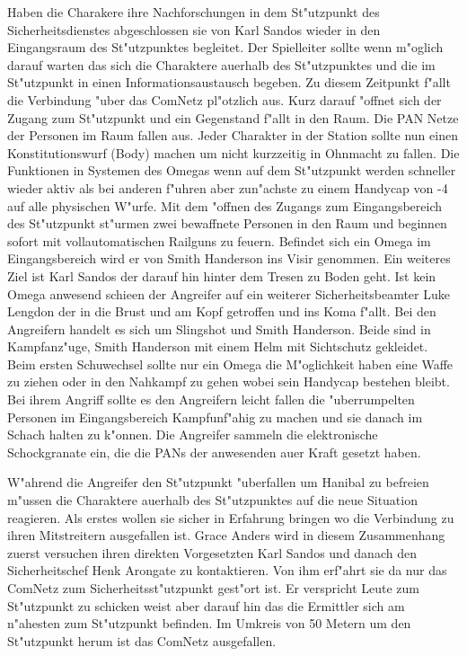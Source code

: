 
Haben die Charakere ihre Nachforschungen in dem St"utzpunkt des Sicherheitsdienstes abgeschlossen sie von Karl Sandos wieder in den Eingangsraum des St"utzpunktes begleitet. Der Spielleiter sollte wenn m"oglich darauf warten das sich die Charaktere au\3erhalb des St"utzpunktes und die im St"utzpunkt in einen Informationsaustausch begeben. Zu diesem Zeitpunkt f"allt die Verbindung "uber das ComNetz pl"otzlich aus. Kurz darauf "offnet sich der Zugang zum St"utzpunkt und ein Gegenstand f"allt in den Raum. Die PAN Netze der Personen im Raum fallen aus. Jeder Charakter in der Station sollte nun einen Konstitutionswurf (Body) machen um nicht kurzzeitig in Ohnmacht zu fallen. Die Funktionen in Systemen des Omegas wenn auf dem St"utzpunkt werden schneller wieder aktiv als bei anderen f"uhren aber zun"achste zu einem Handycap von -4 auf alle physischen W"urfe. Mit dem "offnen des Zugangs zum Eingangsbereich des St"utzpunkt st"urmen zwei bewaffnete Personen in den Raum und beginnen sofort mit vollautomatischen Railguns zu feuern. Befindet sich ein Omega im Eingangsbereich wird er von
Smith Handerson ins Visir genommen. Ein weiteres Ziel ist Karl Sandos der darauf hin hinter dem Tresen zu Boden geht. Ist kein Omega anwesend schie\3en der Angreifer auf ein weiterer Sicherheitsbeamter Luke Lengdon der in die Brust und am Kopf getroffen und ins Koma f"allt. Bei den Angreifern handelt es sich um Slingshot und Smith Handerson. Beide sind in Kampfanz"uge, Smith Handerson mit einem Helm mit Sichtschutz gekleidet. Beim ersten Schu\3wechsel sollte nur ein Omega die M"oglichkeit haben eine Waffe zu ziehen oder in den Nahkampf zu gehen wobei sein Handycap bestehen bleibt. Bei ihrem Angriff sollte es den Angreifern leicht fallen die "uberrumpelten Personen im Eingangsbereich Kampfunf"ahig zu machen und sie danach im Schach halten zu k"onnen. Die Angreifer sammeln die elektronische Schockgranate ein, die die PANs der anwesenden au\3er Kraft gesetzt haben.

W"ahrend die Angreifer den St"utzpunkt "uberfallen um Hanibal zu befreien m"ussen die Charaktere au\3erhalb des St"utzpunktes auf die neue Situation reagieren. Als erstes wollen sie sicher in Erfahrung bringen wo die Verbindung zu ihren Mitstreitern ausgefallen ist. Grace Anders wird in diesem Zusammenhang zuerst versuchen ihren direkten Vorgesetzten Karl Sandos und danach den Sicherheitschef Henk Arongate zu kontaktieren. Von ihm erf"ahrt sie da\3 nur das ComNetz zum Sicherheitsst"utzpunkt gest"ort ist. Er verspricht Leute zum St"utzpunkt zu schicken weist aber darauf hin das die Ermittler sich am n"ahesten zum St"utzpunkt befinden. Im Umkreis von 50 Metern um den St"utzpunkt herum ist das ComNetz ausgefallen. 

